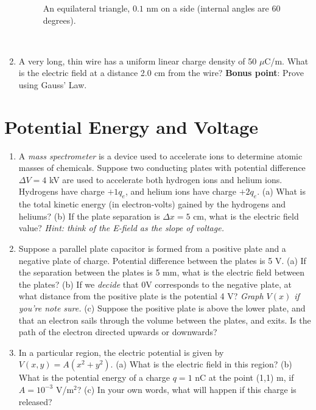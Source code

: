 \documentclass[10pt]{article}
\begin{document}
\begin{enumerate}
\begin{figure}[ht]
\caption{\label{fig:tri} An equilateral triangle, $0.1$ nm on a side (internal angles are 60 degrees).}
\end{figure} \\ \vspace{1cm}
\item A very long, thin wire has a uniform linear charge density of 50 $\mu$C/m.  What is the electric field at a distance 2.0 cm from the wire?  \textbf{Bonus point}: Prove using Gauss' Law.  \\ \vspace{2cm}
\end{enumerate}

\section{Potential Energy and Voltage}

\begin{enumerate}
\item A \textit{mass spectrometer} is a device used to accelerate ions to determine atomic masses of chemicals.  Suppose two conducting plates with potential difference $\Delta V = 4$ kV are used to accelerate both hydrogen ions and helium ions.  Hydrogens have charge $+1 q_e$, and helium ions have charge $+2 q_e$.  (a) What is the total kinetic energy (in electron-volts) gained by the hydrogens and heliums? (b) If the plate separation is $\Delta x = 5$ cm, what is the electric field value?  \textit{Hint: think of the E-field as the slope of voltage.} \\ \vspace{3cm}
\item Suppose a parallel plate capacitor is formed from a positive plate and a negative plate of charge.  Potential difference between the plates is 5 V.  (a) If the separation between the plates is 5 mm, what is the electric field between the plates? (b) If we \textit{decide} that 0V corresponds to the negative plate, at what distance from the positive plate is the potential 4 V?  \textit{Graph $V(x)$ if you're note sure.} (c) Suppose the positive plate is above the lower plate, and that an electron sails through the volume between the plates, and exits.  Is the path of the electron directed upwards or downwards? \\ \vspace{3.5cm}
\item In a particular region, the electric potential is given by $V(x,y) = A (x^2 + y^2)$.  (a) What is the electric field in this region? (b) What is the potential energy of a charge $q = 1$ nC at the point (1,1) m, if $A = 10^{-3}$ V/m$^2$?  (c) In your own words, what will happen if this charge is released? \\ \vspace{2cm}
\end{enumerate}
\end{document}
